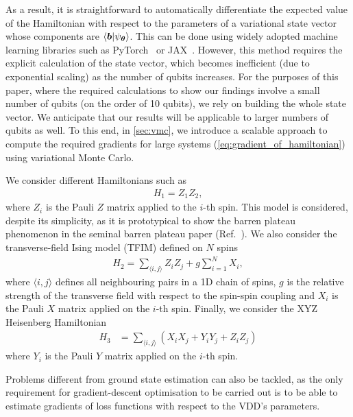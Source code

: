\documentclass{ieeeaccess}
\begin{document}
As a result, it is straightforward to automatically differentiate the expected value of the Hamiltonian with respect to the parameters of a variational state vector whose components are $\braket{\vb*{b}}{\psi_{\vb*{\theta}}}$.
This can be done using widely adopted machine learning libraries such as PyTorch~\cite{paszke2019pytorchimperativestylehighperformance} or JAX~\cite{jax2018github}.
However, this method requires the explicit calculation of the state vector, which becomes inefficient (due to exponential scaling) as the number of qubits increases.
For the purposes of this paper, where the required calculations to show our findings involve a small number of qubits (on the order of 10 qubits), we rely on building the whole state vector.
We anticipate that our results will be applicable to larger numbers of qubits as well.
To this end, in \cref{sec:vmc}, we introduce a scalable approach to compute the required gradients for large systems (\cref{eq:gradient_of_hamiltonian}) using variational Monte Carlo.



We consider different Hamiltonians such as
\begin{align}
    H_1=Z_1Z_2,\label{eq:z1z2}
\end{align}
where $Z_i$ is the Pauli $Z$ matrix applied to the $i$-th spin.
This model is considered, despite its simplicity, as it is prototypical to show the barren plateau phenomenon in the seminal barren plateau paper (Ref.~\cite{mcclean2018barren}).
We also consider the transverse-field Ising model (TFIM) defined on $N$ spins
\begin{align}
    H_2 = \sum_{\langle i, j \rangle}Z_iZ_j + g \sum_{i=1}^NX_i,\label{eq:ising}
\end{align}
where $\langle i,j\rangle$ defines all neighbouring pairs in a 1D chain of spins, $g$ is the relative strength of the transverse field with respect to the spin-spin coupling and $X_i$ is the Pauli $X$ matrix applied on the $i$-th spin.
Finally, we consider the XYZ Heisenberg Hamiltonian
\begin{align}
    H_3 &= \sum_{\langle i, j \rangle} (X_iX_j + Y_iY_j + Z_iZ_j)\label{eq:heisenberg}
\end{align}
where $Y_i$ is the Pauli $Y$ matrix applied on the $i$-th spin.

Problems different from ground state estimation can also be tackled, as the only requirement for gradient-descent optimisation to be carried out is to be able to estimate gradients of loss functions with respect to the VDD's parameters.
\end{document}
